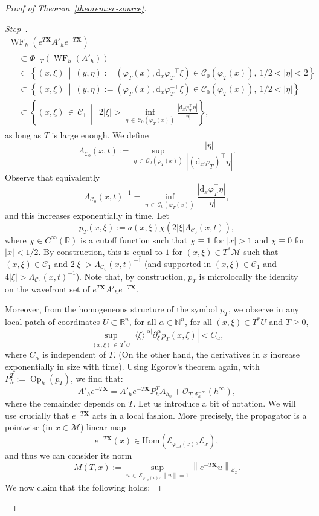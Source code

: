 \documentclass[AHL,Unicode,longabstracts,published]{cedram}
\newcommand{\R}{\mathbb{R}}
\newcommand{\N}{\mathbb{N}}
\newcommand{\X}{\mathbf{X}}
\newcommand{\mc}{\mathcal}
\newcommand{\M}{\mathcal{M}}
\newcommand{\E}{\mathcal{E}}
\newcommand{\clC}{\mathcal{C}}
\newcommand{\dd}{\mathrm{d}}
\newcommand{\Hom}{\mathrm{Hom}}
\DeclareMathOperator{\Op}{Op}
\DeclareMathOperator{\WF}{WF}
\newcounter{stepcount}
\newenvironment{step}{\refstepcounter{stepcount}\begin{proof}[Step~\thestepcount]}{\let\qed\relax\end{proof}}
\begin{document}
\begin{proof}[Proof of Theorem~\ref{theorem:sc-source}]
\begin{step}
\begin{multline*}
\WF_h\left(e^{T\X} A'_h e^{-T\X}\right)\\
\begin{aligned}
&\subset \Phi_{-T}\left(\WF_h(A'_h)\right)\\
&\subset \left\{(x,\xi)\ \middle|\ (y,\eta):=\left(\varphi_T(x), \dd _x\varphi_T^{-\top}\xi\right) \in \clC_0(\varphi_T(x)),\ 1/2 < |\eta| < 2 \right\} \\
&\subset \left\{(x,\xi)\ \middle|\ (y,\eta):=\left(\varphi_T(x), \dd _x\varphi_T^{-\top}\xi\right) \in \clC_0(\varphi_T(x)),\ 1/2 < |\eta| \right\} \\
&\subset \left\{(x,\xi)\,\in\,\clC_1~\middle|~\ 2|\xi| > \inf_{\eta\,\in\,\clC_0(\varphi_T(x))} \frac{\left|\dd_x\varphi_T^{\top}\eta\right|}{|\eta|} \right\},
\end{aligned}
\end{multline*}
as long as $T$ is large enough. We define
\[
\Lambda_{\clC_0}(x,t) := \sup_{\eta\,\in\,\clC_0(\varphi_T(x))} \frac{|\eta|}{\left|(\dd_x \varphi_T)^{\top} \eta\right|}.
\]
Observe that equivalently
\[
\Lambda_{\clC_0}(x,t)^{-1}= \inf_{\eta\,\in \,\clC_0(\varphi_T(x))} \frac{\left|\dd_x\varphi_T^{\top}\eta\right|}{|\eta|},
\]
and this increases exponentially in time. Let
\[
p_T(x,\xi) := a(x,\xi)\chi\left(2|\xi| \Lambda_{\clC_0}(x,t)\right),
\]
where $\chi \in C^\infty(\R)$ is a cutoff function such that $\chi \equiv 1$ for $|x| > 1$ and $\chi \equiv 0$ for $|x| < 1/2$. By construction, this is equal to $1$ for $(x,\xi) \in T^*\M$ such that $(x,\xi) \in \clC_1$ and $2 |\xi|> \Lambda_{\clC_0}(x,t)^{-1}$ (and supported in $(x,\xi) \in \clC_1$ and $4 |\xi|> \Lambda_{\clC_0}(x,t)^{-1}$). Note that, by construction, $p_T$ is microlocally the identity on the wavefront set of $e^{T\X} A'_h e^{-T\X}$.

Moreover, from the homogeneous structure of the symbol $p_T$, we observe in any local patch of coordinates $U \subset \R^n$, for all $\alpha\in \N^n$, for all $(x,\xi) \in T^*U$ and $T \geq 0$,
\[
\sup_{(x,\xi)\,\in\,T^*U} \left|\langle\xi\rangle^{|\alpha|} \partial_\xi^\alpha p_T(x,\xi)\right| < C_\alpha,
\]
where $C_\alpha$ is independent of $T$. (On the other hand, the derivatives in $x$ increase exponentially in size with time). Using Egorov's theorem again, with $P_h^T := \Op_h(p_T)$, we find that:
\begin{equation}\label{equation:this-is-life}
A'_h e^{-T \X} = A'_h e^{-T \X} P_h^T A_{h_0} + \mc{O}_{T, \Psi^{-\infty}_h}(h^\infty),
\end{equation}
where the remainder depends on $T$. Let us introduce a bit of notation. We will use crucially that $e^{-T\X}$ acts in a local fashion. More precisely, the propagator is a pointwise (in $x \in \M$) linear map
\[
e^{-T \X}(x)\in \Hom\left(\E_{\varphi_{-t}(x)}, \E_x\right),
\]
and thus we can consider its norm
\[
M(T,x) := \sup_{u\,\in\,\E_{\varphi_{-t}(x)}, \|u\|=1} \left\|e^{-T \X}u\right\|_{\E_x}.
\]
We now claim that the following holds:


\end{step}
\end{proof}
\end{document}
